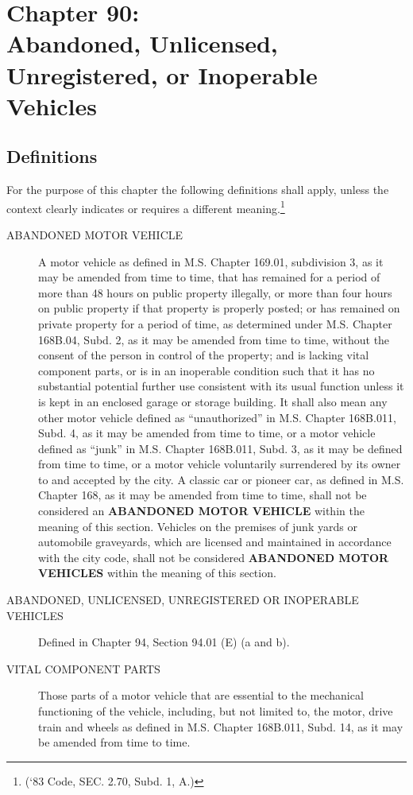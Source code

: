 \chapter*{Chapter 90: \\
	Abandoned, Unlicensed, Unregistered, or Inoperable Vehicles}
    \minitoc
    \pagebreak

\section{Definitions}
For the purpose of this chapter the following definitions shall apply, unless the context clearly indicates or requires a different meaning.\footnote{(‘83 Code, SEC. 2.70, Subd. 1, A.)}
\begin{description}
\item[ABANDONED MOTOR VEHICLE] A motor vehicle as defined in M.S. Chapter 169.01, subdivision 3, as it may be amended from time to time, that has remained for a period of more than 48 hours on public property illegally, or more than four hours on public property if that property is properly posted; or has remained on private property for a period of time, as determined under M.S. Chapter 168B.04, Subd. 2, as it may be amended from time to time, without the consent of the person in control of the property; and is lacking vital component parts, or is in an inoperable condition such that it has no substantial potential further use consistent with its usual function unless it is kept in an enclosed garage or storage building.  It shall also mean any other motor vehicle defined as “unauthorized” in M.S. Chapter 168B.011, Subd. 4, as it may be amended from time to time, or a motor vehicle defined as “junk” in M.S. Chapter 168B.011, Subd. 3, as it may be defined from time to time, or a motor vehicle voluntarily surrendered by its owner to and accepted by the city.  A classic car or pioneer car, as defined in M.S. Chapter 168, as it may be amended from time to time, shall not be considered an \textbf{ABANDONED MOTOR VEHICLE} within the meaning of this section.  Vehicles on the premises of junk yards or automobile graveyards, which are licensed and maintained in accordance with the city code, shall not be considered \textbf{ABANDONED MOTOR VEHICLES} within the meaning of this section.
\item[ABANDONED, UNLICENSED, UNREGISTERED OR INOPERABLE VEHICLES] Defined in Chapter 94, Section 94.01 (E) (a and b).
\item[VITAL COMPONENT PARTS] Those parts of a motor vehicle that are essential to the mechanical functioning of the vehicle, including, but not limited to, the motor, drive train and wheels as defined in M.S. Chapter 168B.011, Subd. 14, as it may be amended from time to time.
\end{description}

